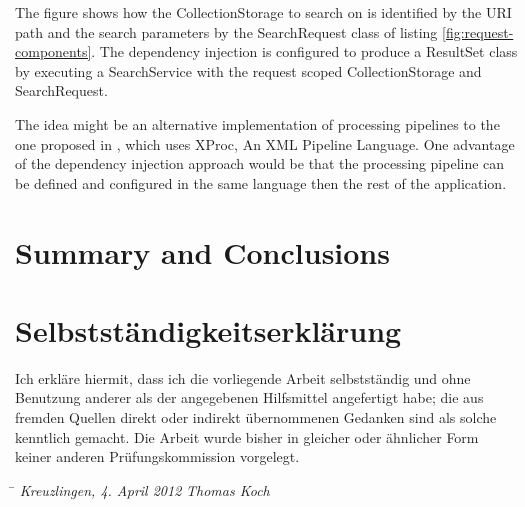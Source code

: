 \documentclass[12pt,a4paper,twoside]{scrartcl}		%
\begin{document}
The figure shows how the CollectionStorage to search on is identified by the URI
path and the search parameters by the SearchRequest class of listing
\ref{fig:request-components}. The dependency injection is configured to produce
a ResultSet class by executing a SearchService with the request scoped
CollectionStorage and SearchRequest.

The idea might be an alternative implementation of processing pipelines to the
one proposed in \cite{Davis:2011:XTR:1967428.1967437}, which uses XProc, An XML
Pipeline Language. One advantage of the dependency injection approach would be
that the processing pipeline can be defined and configured in the same language
then the rest of the application.




\section{Summary and Conclusions}

\newpage
{}


\section*{Selbstständigkeitserklärung}
\thispagestyle{empty}
Ich erkläre hiermit, dass ich die vorliegende Arbeit selbstständig und ohne
Benutzung anderer als der angegebenen Hilfsmittel angefertigt habe; die aus
fremden Quellen direkt oder indirekt übernommenen Gedanken sind als solche
kenntlich gemacht.  Die Arbeit wurde bisher in gleicher oder ähnlicher Form
keiner anderen Prüfungskommission vorgelegt.
\vspace{3cm}
\begin{tabbing}
\hspace{6cm}  \= \kill
\textit{Kreuzlingen, 4. April 2012} \> \textit{Thomas Koch}
\end{tabbing}
\end{document}
